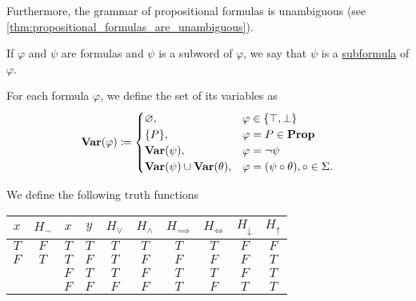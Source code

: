 \begin{definition}
  Furthermore, the grammar of propositional formulas is unambiguous (see \cref{thm:propositional_formulas_are_unambiguous}).

  If $\varphi$ and $\psi$ are formulas and $\psi$ is a subword of $\varphi$, we say that $\psi$ is a \ul{subformula} of $\varphi$.

  For each formula $\varphi$, we define the set of its variables as
  \begin{align*}
    \operatorname{\mathbf{Var}}(\varphi) \coloneqq \begin{cases}
      \varnothing,                              &\varphi \in \{ \top, \bot \} \\
      \{ P \},                                  &\varphi = P \in \operatorname{\mathbf{Prop}} \\
      \operatorname{\mathbf{Var}}(\psi),                         &\varphi = \neg \psi \\
      \operatorname{\mathbf{Var}}(\psi) \cup \operatorname{\mathbf{Var}}(\theta), &\varphi = (\psi \circ \theta), \circ \in \Sigma.
    \end{cases}
  \end{align*}
\end{definition}

\begin{definition}\label{def:truth_functions}
  We define the following truth functions
  \begin{center}
    \begin{tabular}{c | c || c c | c c c c c c}
      $x$    & $H_\neg$ & $x$    & $y$    & $H_\lor$ & $H_\land$ & $H_{\implies}$ & $H_{\iff}$ & $H_\downarrow$ & $H_\uparrow$ \\
      \hline
      $T$    & $F$      & $T$    & $T$    & $T$      & $T$       & $T$          & $T$      & $F$            & $F$    \\
      $F$    & $T$      & $T$    & $F$    & $T$      & $F$       & $F$          & $F$      & $F$            & $T$    \\
             &          & $F$    & $T$    & $T$      & $F$       & $T$          & $T$      & $F$            & $T$    \\
             &          & $F$    & $F$    & $F$      & $F$       & $T$          & $F$      & $T$            & $T$
    \end{tabular}
  \end{center}
\end{definition}

